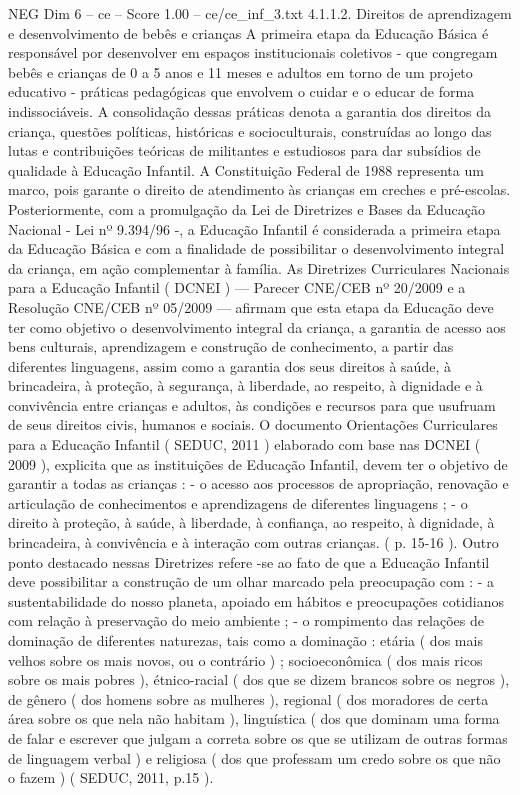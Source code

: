 \begin{textsample}{NEG Dim 6 – ce – Score 1.00 – ce/ce\_inf\_3.txt}  \label{ex:f6_neg_254}
4.1.1.2.
Direitos de aprendizagem e desenvolvimento de bebês e crianças A primeira etapa da Educação Básica é responsável por desenvolver em espaços institucionais coletivos - que congregam bebês e crianças de 0 a 5 anos e 11 meses e adultos em torno de um projeto educativo - práticas pedagógicas que envolvem o cuidar e o educar de forma indissociáveis.
A consolidação dessas práticas denota a garantia dos direitos da criança, questões políticas, históricas e socioculturais, construídas ao longo das lutas e contribuições teóricas de militantes e estudiosos para dar subsídios de qualidade à Educação Infantil.
A Constituição Federal de 1988 representa um marco, pois garante o direito de atendimento às crianças em creches e pré-escolas.
Posteriormente, com a promulgação da Lei de Diretrizes e Bases da Educação Nacional - Lei nº 9.394/96 -, a Educação Infantil é considerada a primeira etapa da Educação Básica e com a finalidade de possibilitar o desenvolvimento integral da criança, em ação complementar à família.
As Diretrizes Curriculares Nacionais para a Educação Infantil ( DCNEI ) — Parecer CNE/CEB nº 20/2009 e a Resolução CNE/CEB nº 05/2009 — afirmam que esta etapa da Educação deve ter como objetivo o desenvolvimento integral da criança, a garantia de acesso aos bens culturais, aprendizagem e construção de conhecimento, a partir das diferentes linguagens, assim como a garantia dos seus direitos à saúde, à brincadeira, à proteção, à segurança, à liberdade, ao respeito, à dignidade e à convivência entre crianças e adultos, às condições e recursos para que usufruam de seus direitos civis, humanos e sociais.
O documento Orientações Curriculares para a Educação Infantil ( SEDUC, 2011 ) elaborado com base nas DCNEI ( 2009 ), explicita que as instituições de Educação Infantil, devem ter o objetivo de garantir a todas as crianças : - o acesso aos processos de apropriação, renovação e articulação de conhecimentos e aprendizagens de diferentes linguagens ; - o direito à proteção, à saúde, à liberdade, à confiança, ao respeito, à dignidade, à brincadeira, à convivência e à interação com outras crianças. ( p. 15-16 ).
Outro ponto destacado nessas Diretrizes refere -se ao fato de que a Educação Infantil deve possibilitar a construção de um olhar marcado pela preocupação com : - a sustentabilidade do nosso planeta, apoiado em hábitos e preocupações cotidianos com relação à preservação do meio ambiente ; - o rompimento das relações de dominação de diferentes naturezas, tais como a dominação : etária ( dos mais velhos sobre os mais novos, ou o contrário ) ; socioeconômica ( dos mais ricos sobre os mais pobres ), étnico-racial ( dos que se dizem brancos sobre os negros ), de gênero ( dos homens sobre as mulheres ), regional ( dos moradores de certa área sobre os que nela não habitam ), linguística ( dos que dominam uma forma de falar e escrever que julgam a correta sobre os que se utilizam de outras formas de linguagem verbal ) e religiosa ( dos que professam um credo sobre os que não o fazem ) ( SEDUC, 2011, p.15 ).

\end{textsample}
